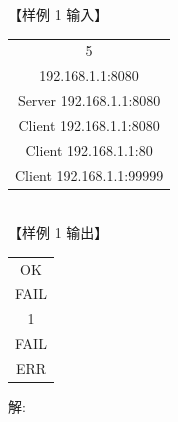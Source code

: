 \documentclass[12pt,twiside,a4paper]{ctexbook}
\numberwithin{chapter}{part}
\begin{document}
【样例 1 输入】\\
\begin{tabular}{|c|}
\hline
5\\
192.168.1.1:8080\\
Server 192.168.1.1:8080\\
Client 192.168.1.1:8080\\
Client 192.168.1.1:80\\
Client 192.168.1.1:99999\\
\hline
\end{tabular}\\
【样例 1 输出】\\
\begin{tabular}{|c|}
\hline
OK\\
FAIL\\
1\\
FAIL\\
ERR\\
\hline
\end{tabular}
解:\\
\end{document}
